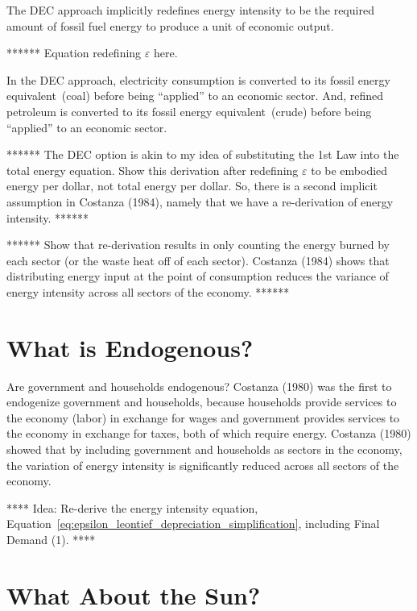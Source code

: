 The DEC approach implicitly redefines energy intensity 
to be the required amount of fossil fuel energy to produce a unit of economic output. 

****** Equation redefining $\varepsilon$ here.

In the DEC approach, 
electricity consumption is converted to its fossil energy equivalent~(coal) 
before being ``applied'' to an economic sector. 
And, refined petroleum is converted to its fossil energy equivalent~(crude) 
before being ``applied'' to an economic sector.

****** The DEC option is akin to my idea of substituting the 
1st Law into the total energy equation. 
Show this derivation after redefining $\varepsilon$ 
to be embodied energy per dollar, not total energy per dollar. 
So, there is a second implicit assumption in Costanza (1984), 
namely that we have a re-derivation of energy intensity. ******

****** Show that re-derivation results in 
only counting the energy burned by each sector 
(or the waste heat off of each sector). 
Costanza (1984) shows that distributing energy input 
at the point of consumption reduces the variance 
of energy intensity across all sectors of the economy. ******


\section{What is Endogenous?}

Are government and households endogenous? 
Costanza (1980) was the first to endogenize government and households, 
because households provide services to the economy (labor) 
in exchange for wages and government provides services 
to the economy in exchange for taxes, both of which require energy. 
Costanza (1980) showed that by including government and households 
as sectors in the economy, 
the variation of energy intensity is significantly reduced 
across all sectors of the economy. 

**** Idea: Re-derive the energy intensity equation,
Equation~\ref{eq:epsilon_leontief_depreciation_simplification},
including Final Demand (1). ****


\section{What About the Sun?}

